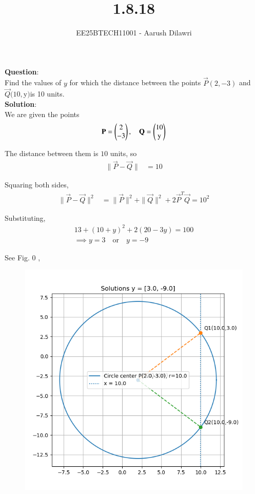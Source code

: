 \documentclass[journal]{IEEEtran}
\begin{document}

\vspace{3cm}

\title{1.8.18}
\author{EE25BTECH11001 - Aarush Dilawri}
{\let\newpage\relax\maketitle}

\renewcommand{\thefigure}{\theenumi}
\renewcommand{\thetable}{\theenumi}
\setlength{\intextsep}{10pt} %
\textbf{Question}:\\
Find the values of $y$ for which the distance between the points $\vec{P}(2,-3)$ and $\vec{Q}(10,$y$)$is 10 units.\\
\textbf{Solution}:\\

We are given the points
\begin{align}
\vec{P} = \myvec{2\\-3}, \quad 
\vec{Q} = \myvec{10\\$y$}
\end{align}

The distance between them is $10$ units, so
\begin{align}
\|\vec{P}-\vec{Q}\| &= 10
\end{align}

Squaring both sides,
\begin{align}
\|\vec{P}-\vec{Q}\|^2 &= \|\vec{P}\|^2 + \|\vec{Q}\|^2 + 2\vec{P}^T\vec{Q} = 10^2
\end{align}

Substituting,
\begin{align}
13 + (10 + y)^2 + 2(20 -3y) = 100\\
\implies y = 3 \quad \text{or} \quad y = -9
\end{align}

\newpage
See Fig. 0 ,
\begin{figure}[H]
\begin{center}
\includegraphics[width=0.6\columnwidth]{figs/fig.png}
\end{center}
\caption{}
\label{fig:Fig1}
\end{figure}
\end{document}
